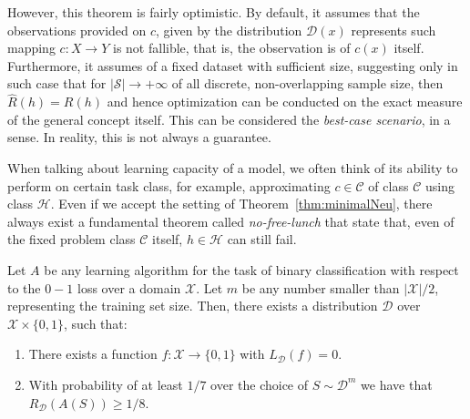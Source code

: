 \documentclass[10pt]{article} %
\begin{document}
However, this theorem is fairly optimistic. By default, it assumes that the observations provided on $c$, given by the distribution $\mathcal{D}(x)$ represents such mapping $c:X\to Y$ is not fallible, that is, the observation is of $c(x)$ itself. Furthermore, it assumes of a fixed dataset with sufficient size, suggesting only in such case that for $|\mathcal{S}|\to +\infty$ of all discrete, non-overlapping sample size, then $\hat{R}(h)=R(h)$ and hence optimization can be conducted on the exact measure of the general concept itself. This can be considered the \textit{best-case scenario}, in a sense. In reality, this is not always a guarantee. 

When talking about learning capacity of a model, we often think of its ability to perform on certain task class, for example, approximating $c\in \mathcal{C}$ of class $\mathcal{C}$ using class $\mathcal{H}$. Even if we accept the setting of Theorem~\ref{thm:minimalNeu}, there always exist a fundamental theorem called \textit{no-free-lunch} that state that, even of the fixed problem class $\mathcal{C}$ itself, $h\in\mathcal{H}$ can still fail. 

\begin{theorem}
    Let $A$ be any learning algorithm for the task of binary classification with respect to the $0-1$ loss over a domain $\mathcal{X}$. Let $m$ be any number smaller than $|\mathcal{X}|/2$, representing the training set size. Then, there exists a distribution $\mathcal{D}$ over $\mathcal{X}\times \{0,1\}$, such that: 
    \begin{enumerate}
        \item There exists a function $f:\mathcal{X}\to \{0,1\}$ with $L_{\mathcal{D}}(f)= 0$. 
        \item With probability of at least $1/7$ over the choice of $S\sim \mathcal{D}^{m}$ we have that $R_{\mathcal{D}}(A(S))\geq 1/8$. 
    \end{enumerate}
\end{theorem}
\end{document}
